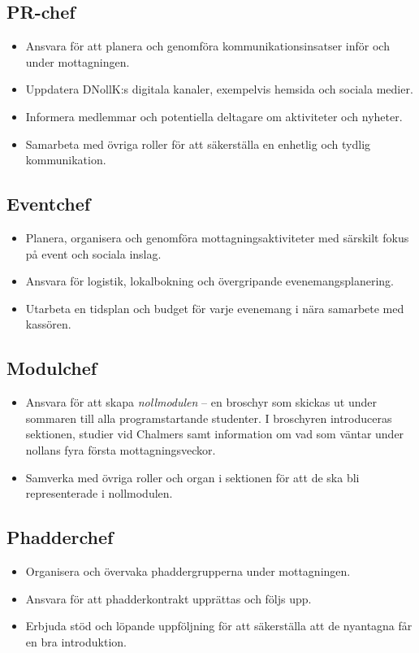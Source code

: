 \documentclass[a4paper]{dtekinstruktion}
\begin{document}
\subsection{PR-chef}
\begin{itemize}
  \item Ansvara för att planera och genomföra kommunikationsinsatser inför och under mottagningen.
  \item Uppdatera DNollK:s digitala kanaler, exempelvis hemsida och sociala medier.
  \item Informera medlemmar och potentiella deltagare om aktiviteter och nyheter.
  \item Samarbeta med övriga roller för att säkerställa en enhetlig och tydlig kommunikation.
\end{itemize}

\subsection{Eventchef}
\begin{itemize}
  \item Planera, organisera och genomföra mottagningsaktiviteter med särskilt fokus på event och sociala inslag.
  \item Ansvara för logistik, lokalbokning och övergripande evenemangsplanering.
  \item Utarbeta en tidsplan och budget för varje evenemang i nära samarbete med kassören.
\end{itemize}

\subsection{Modulchef}
\begin{itemize}
  \item Ansvara för att skapa \emph{nollmodulen} – en broschyr som skickas ut under sommaren till alla programstartande studenter. I broschyren introduceras sektionen, studier vid Chalmers samt information om vad som väntar under nollans fyra första mottagningsveckor.
  \item Samverka med övriga roller och organ i sektionen för att de ska bli representerade i nollmodulen.
\end{itemize}

\subsection{Phadderchef}
\begin{itemize}
  \item Organisera och övervaka phaddergrupperna under mottagningen.
  \item Ansvara för att phadderkontrakt upprättas och följs upp.
  \item Erbjuda stöd och löpande uppföljning för att säkerställa att de nyantagna får en bra introduktion.
\end{itemize}
\end{document}
